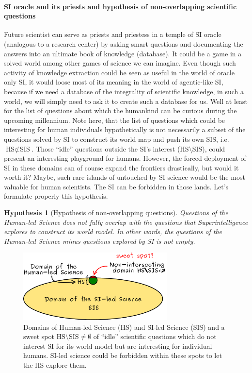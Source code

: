 \documentclass[a4paper,11pt]{article}
\newtheorem{hypothesis}{Hypothesis}
\begin{document}
\paragraph{SI oracle and its priests and hypothesis of non-overlapping scientific questions\label{sec:oracle}}
Future scientist can serve as priests and priestess in a temple of SI oracle (analogous to a research center) by asking smart questions and documenting the answers into an ultimate book of knowledge (database). It could be a game in a solved world among other games of science we can imagine. Even though such activity of knowledge extraction could be seen as useful in the world of oracle only SI, it would loose most of its meaning in the world of agentic-like SI, because if we need a database of the integrality of scientific knowledge, in such a world, we will simply need to ask it to create such a database for us. Well at least for the list of questions about which the humankind can be curious during the upcoming millennium. Note here, that the list of questions which could be interesting for human individuals hypothetically is not necessarily a subset of the questions solved by SI to construct its world map and push its own SIS, i.e. $\text{HS} \not\subset \text{SIS}$. Those ``idle'' questions outside the SI's interest ($\text{HS} \setminus \text{SIS}$), could present an interesting playground for humans. However, the forced deployment of SI in these domains can of course expand the frontiers drastically, but would it worth it? Maybe, such rare islands of untouched by SI science would be the most valuable for human scientists. The SI can be forbidden in those lands.
Let's formulate properly this hypothesis.

\begin{hypothesis}[Hypothesis of non-overlapping questions]\label{hyp:SI}
Questions of the Human-led Science does not fully overlap with the questions that Superintelligence explores to construct its world model. In other words, the questions of the Human-led Science minus questions explored by SI is not empty.
\end{hypothesis}



\begin{figure}[h!]
    \centering\includegraphics[width=0.7\textwidth]{intersections}
    \caption{\label{fig:intersection}Domains of Human-led Science (HS) and SI-led Science (SIS) and a sweet spot $\text{HS} \setminus \text{SIS} \ne \emptyset$ of ``idle'' scientific questions which do not interest SI for its world model but are interesting for individual humans. SI-led science could be forbidden within these spots to let the HS explore them.}
\end{figure}
\end{document}
